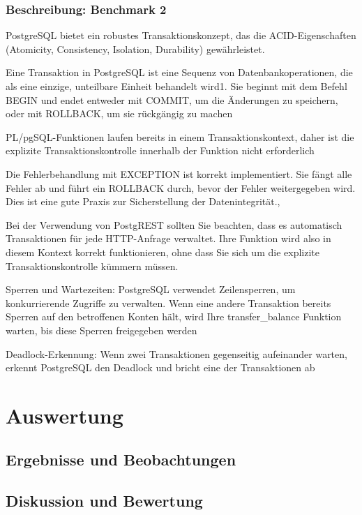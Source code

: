 \documentclass[fontsize=12pt,paper=a4,twoside=semi,parskip=half-,headsepline,headinclude]{scrreprt}
\begin{document}
\subsection{Beschreibung: Benchmark 2}

PostgreSQL bietet ein robustes Transaktionskonzept, das die ACID-Eigenschaften (Atomicity, Consistency, Isolation, Durability) gewährleistet.

Eine Transaktion in PostgreSQL ist eine Sequenz von Datenbankoperationen, die als eine einzige, unteilbare Einheit behandelt wird1. Sie beginnt mit dem Befehl BEGIN und endet entweder mit COMMIT, um die Änderungen zu speichern, oder mit ROLLBACK, um sie rückgängig zu machen

PL/pgSQL-Funktionen laufen bereits in einem Transaktionskontext, daher ist die explizite Transaktionskontrolle innerhalb der Funktion nicht erforderlich

Die Fehlerbehandlung mit EXCEPTION ist korrekt implementiert. Sie fängt alle Fehler ab und führt ein ROLLBACK durch, bevor der Fehler weitergegeben wird. Dies ist eine gute Praxis zur Sicherstellung der Datenintegrität.,

Bei der Verwendung von PostgREST sollten Sie beachten, dass es automatisch Transaktionen für jede HTTP-Anfrage verwaltet. Ihre Funktion wird also in diesem Kontext korrekt funktionieren, ohne dass Sie sich um die explizite Transaktionskontrolle kümmern müssen.

Sperren und Wartezeiten:
PostgreSQL verwendet Zeilensperren, um konkurrierende Zugriffe zu verwalten. Wenn eine andere Transaktion bereits Sperren auf den betroffenen Konten hält, wird Ihre transfer\_balance Funktion warten, bis diese Sperren freigegeben werden

Deadlock-Erkennung:
Wenn zwei Transaktionen gegenseitig aufeinander warten, erkennt PostgreSQL den Deadlock und bricht eine der Transaktionen ab


\chapter{Auswertung}

\section{Ergebnisse und Beobachtungen}

\section{Diskussion und Bewertung}
\end{document}

